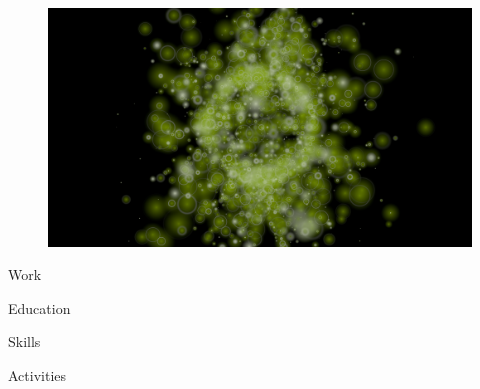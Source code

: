 \documentclass[11pt,A4]{article}
\renewcommand{\section}{ 			%
\hrulefill

\vspace{-2pt}
\large

}
\begin{document}
\pagestyle{fancy}
\begin{figure}[htbp]
    \begin{center}
            \includegraphics[trim=0 150 0 150,clip,width=\textwidth]{4436.png}	%
    \end{center}
\end{figure}
\vspace{-20pt}

\section{Work}

\section{Education}

\section{Skills}

\section{Activities}
\end{document}
